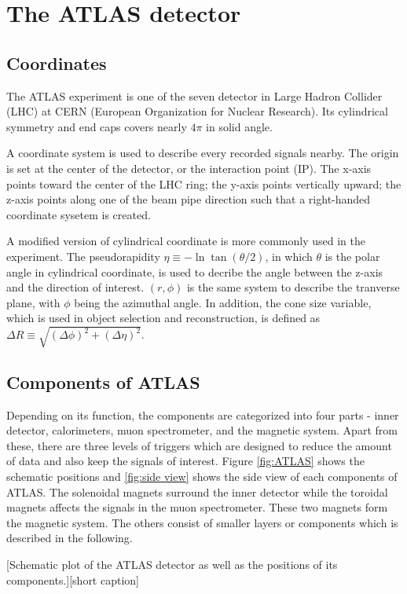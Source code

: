 \documentclass[class=NCU_thesis, crop=false]{standalone}
\begin{document}
\chapter{The ATLAS detector}\label{ATLAS}
\section{Coordinates}
	The ATLAS experiment is one of the seven detector in Large Hadron Collider (LHC) at CERN (European Organization for Nuclear Research). Its cylindrical symmetry and end caps covers nearly $4\pi$ in solid angle.
	
	A coordinate system is used to describe every recorded signals nearby. The origin is set at the center of the detector, or the interaction point (IP). The x-axis points toward the center of the LHC ring; the y-axis points vertically upward; the z-axis points along one of the beam pipe direction such that a right-handed coordinate sysetem is created.
	
	A modified version of cylindrical coordinate is more commonly used in the experiment. The pseudorapidity $\eta \equiv -\ln\tan(\theta / 2)$, in which $\theta$ is the polar angle in cylindrical coordinate, is used to decribe the angle between the z-axis and the direction of interest. $(r, \phi)$ is the same system to describe the tranverse plane, with $\phi$ being the azimuthal angle. In addition, the cone size variable, which is used in object selection and reconstruction, is defined as $\Delta R \equiv \sqrt{(\Delta \phi)^2 + (\Delta \eta)^2}$.

\section{Components of ATLAS}
	Depending on its function, the components are categorized into four parts - inner detector, calorimeters, muon spectrometer, and the magnetic system. Apart from these, there are three levels of triggers which are designed to reduce the amount of data and also keep the signals of interest. Figure \ref{fig:ATLAS} shows the schematic positions and \ref{fig:side view} shows the side view of each components of ATLAS. The solenoidal magnets surround the inner detector while the toroidal magnets affects the signals in the muon spectrometer. These two magnets form the magnetic system. The others consist of smaller layers or components which is described in the following.
	
	[Schematic plot of the ATLAS detector as well as the positions of its components.][short caption]
	
\end{document}
